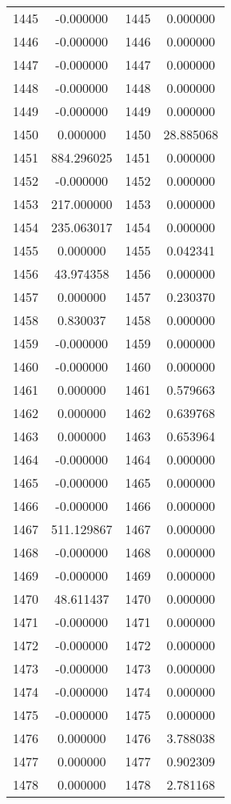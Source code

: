 \documentclass[12pt]{article}
\begin{document}
\begin{longtable}{@{}cccc@{}}
1445 & -0.000000 & 1445 & 0.000000 \\
1446 & -0.000000 & 1446 & 0.000000 \\
1447 & -0.000000 & 1447 & 0.000000 \\
1448 & -0.000000 & 1448 & 0.000000 \\
1449 & -0.000000 & 1449 & 0.000000 \\
1450 & 0.000000 & 1450 & 28.885068 \\
1451 & 884.296025 & 1451 & 0.000000 \\
1452 & -0.000000 & 1452 & 0.000000 \\
1453 & 217.000000 & 1453 & 0.000000 \\
1454 & 235.063017 & 1454 & 0.000000 \\
1455 & 0.000000 & 1455 & 0.042341 \\
1456 & 43.974358 & 1456 & 0.000000 \\
1457 & 0.000000 & 1457 & 0.230370 \\
1458 & 0.830037 & 1458 & 0.000000 \\
1459 & -0.000000 & 1459 & 0.000000 \\
1460 & -0.000000 & 1460 & 0.000000 \\
1461 & 0.000000 & 1461 & 0.579663 \\
1462 & 0.000000 & 1462 & 0.639768 \\
1463 & 0.000000 & 1463 & 0.653964 \\
1464 & -0.000000 & 1464 & 0.000000 \\
1465 & -0.000000 & 1465 & 0.000000 \\
1466 & -0.000000 & 1466 & 0.000000 \\
1467 & 511.129867 & 1467 & 0.000000 \\
1468 & -0.000000 & 1468 & 0.000000 \\
1469 & -0.000000 & 1469 & 0.000000 \\
1470 & 48.611437 & 1470 & 0.000000 \\
1471 & -0.000000 & 1471 & 0.000000 \\
1472 & -0.000000 & 1472 & 0.000000 \\
1473 & -0.000000 & 1473 & 0.000000 \\
1474 & -0.000000 & 1474 & 0.000000 \\
1475 & -0.000000 & 1475 & 0.000000 \\
1476 & 0.000000 & 1476 & 3.788038 \\
1477 & 0.000000 & 1477 & 0.902309 \\
1478 & 0.000000 & 1478 & 2.781168 \\

\end{longtable}
\end{document}
